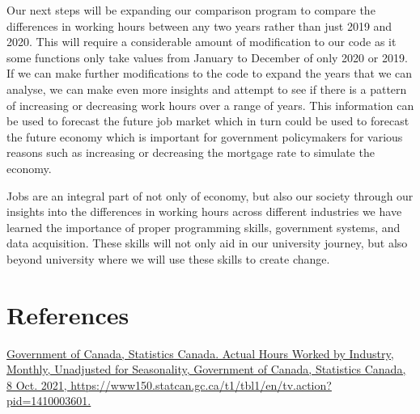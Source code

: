 \documentclass[fontsize=11pt]{article}
\begin{document}
\medskip

Our next steps will be expanding our comparison program to compare the differences in working hours between any two years rather than just 2019 and 2020. This will require a considerable amount of modification to our code as it some functions only take values from January to December of only 2020 or 2019. If we can make further modifications to the code to expand the years that we can analyse, we can make even more insights and attempt to see if there is a pattern of increasing or decreasing  work hours over a range of years. This information can be used to forecast the future job market which in turn could be used to forecast the future economy which is important for government policymakers for various reasons such as increasing or decreasing the mortgage rate to simulate the economy.

Jobs are an integral part of not only of economy, but also our society through our insights into the differences in working hours across different industries we have learned the importance of proper programming skills, government systems, and data acquisition. These skills will not only aid in our university journey, but also beyond university where we will use these skills to create change.


\section{References}
 
\href{ https://www150.statcan.gc.ca/t1/tbl1/en/tv.action?pid=1410003601 }{ Government of Canada, Statistics Canada. Actual Hours Worked by Industry, Monthly, Unadjusted for Seasonality, Government of Canada, Statistics Canada, 8 Oct. 2021, https://www150.statcan.gc.ca/t1/tbl1/en/tv.action?pid=1410003601. } 

  
  
  
\end{document}

